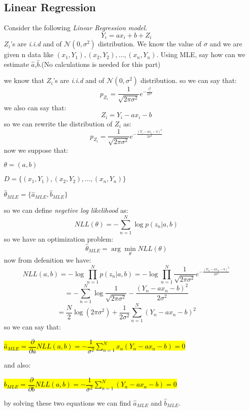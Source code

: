 \subsection{Linear Regression}
Consider the following \textit{Linear Regression model}.
$$Y_i = ax_i + b + Z_i$$
$Z_i$’s are \textit{i.i.d} and of $\mathcal{N}(0,\sigma^2)$ distribution. We know the value of $\sigma$ and we are given n data
like $(x_1, Y_1),(x_2, Y_2), \dots ,(x_n, Y_n)$. Using MLE, say how can we estimate $\hat{a}$,$\hat{b}$.(No calculations is needed for this part)
\begin{qsolve}
	\begin{qsolve}[]
		we know that $Z_i$'s are \textit{i.i.d} and of $\mathcal{N}(0,\sigma^2)$ distribution. so we can say that:
		$$p_{Z_i} = \dfrac{1}{\sqrt{2\pi\sigma^2}} e^{-\frac{z_i^2}{2\sigma^2}}$$
		\splitqsolve[\splitqsolve]
		we also can say that:
		$$Z_i = Y_i - ax_i - b$$
		so we can rewrite the distribution of $Z_i$ as:
		$$p_{Z_i} = \dfrac{1}{\sqrt{2\pi\sigma^2}} e^{-\frac{(Y_i - ax_i - b)^2}{2\sigma^2}}$$
		now we suppose that:
		\begin{mylist}
			\item $\theta = (a , b)$
			\item $D = \{(x_1, Y_1),(x_2, Y_2), \dots ,(x_n, Y_n)\}$
			\item $\hat{\theta}_{MLE} =\{\hat{a}_{MLE}, \hat{b}_{MLE}\}$
		\end{mylist}
		so we can define \textit{negetive log likelihood} as:
		$$NLL(\theta) = -\sum_{n=1}^{N} \log p(z_n|a, b)$$
		so we have an optimization problem:
		$$\hat{\theta}_{MLE} = \arg \min_{\theta} NLL(\theta)$$
		now from defenition we have:
		$$NLL(a,b) = -\log \prod_{n=1}^{N} p(z_n|a, b) = -\log \prod_{n=1}^{N} \dfrac{1}{\sqrt{2\pi\sigma^2}} e^{-\frac{(Y_n - ax_n - b)^2}{2\sigma^2}}$$
		$$= -\sum_{n=1}^{N} \log \dfrac{1}{\sqrt{2\pi\sigma^2}} - \dfrac{(Y_n - ax_n - b)^2}{2\sigma^2}$$
		$$ = \dfrac{N}{2}\log(2\pi \sigma^2) + \dfrac{1}{2\sigma^2} \sum_{n=1}^{N} (Y_n - ax_n - b)^2$$
		so we can say that:
		\begin{center}
			\hl{$\hat{a}_{MLE} = \dfrac{\partial}{\partial a} NLL(a, b) = -\dfrac{1}{\sigma^2} \sum_{n=1}^{N} x_n(Y_n - ax_n - b) = 0$}
		\end{center}
		and also:
		\begin{center}
			\hl{$\hat{b}_{MLE} = \dfrac{\partial}{\partial b} NLL(a, b) = -\dfrac{1}{\sigma^2} \sum_{n=1}^{N} (Y_n - ax_n - b) = 0$}
		\end{center}
		by solving these two equations we can find $\hat{a}_{MLE}$ and $\hat{b}_{MLE}$. 
	\end{qsolve}
\end{qsolve}
